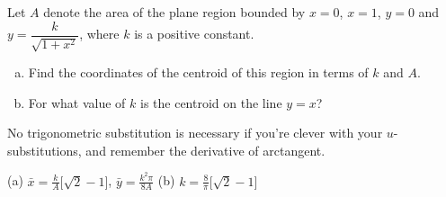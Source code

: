 \begin{Mquestion}[1996D]
Let $A$ denote the area of the plane region bounded by $x=0$,
$x=1$, $y=0$ and $y=\dfrac{k}{\sqrt{1+x^2}}$, where $k$ is a positive constant.
\begin{enumerate}[(a)]
\item
Find the coordinates of the centroid of this region in terms of $k$ and $A$.
\item
For what value of $k$ is the centroid on the line $y=x$?
\end{enumerate}
\end{Mquestion}
\begin{hint}
No trigonometric substitution is necessary if you're clever with your $u$-substitutions, and remember the derivative of arctangent.
\end{hint}
\begin{answer} (a)
$\displaystyle\bar x = \frac{k}{A}\big[\sqrt{2}-1\big]$,\quad
$\displaystyle\bar y = \frac{k^2\pi}{8A}$
\qquad  (b)
$\displaystyle k=\frac{8}{\pi}\big[\sqrt{2}-1\big]$

\end{answer}

